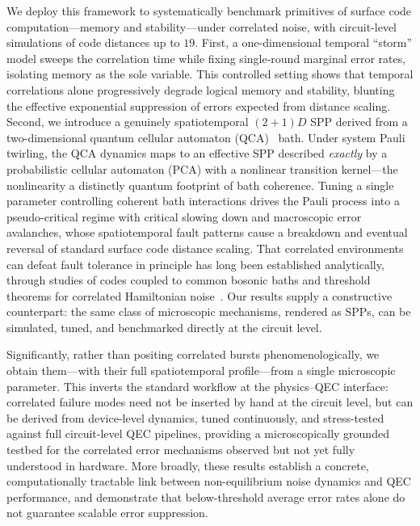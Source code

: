 \documentclass[
    aps,
    prx,
    reprint,
    superscriptaddress,
    longbibliography,
    nofootinbib,
    floatfix,
]{revtex4-2}
\begin{document}
We deploy this framework to systematically benchmark primitives of surface code computation---memory and stability---under correlated noise, with circuit-level simulations of code distances up to \(19\). First, a one-dimensional temporal ``storm'' model sweeps the correlation time while fixing single-round marginal error rates, isolating memory as the sole variable. This controlled setting shows that temporal correlations alone progressively degrade logical memory and stability, blunting the effective exponential suppression of errors expected from distance scaling. Second, we introduce a genuinely spatiotemporal \((2+1)D\) SPP derived from a two-dimensional quantum cellular automaton (QCA)~\cite{schumacherReversibleQuantumCellular2004,farrellyReviewQuantumCellular2020} bath. Under system Pauli twirling, the QCA dynamics maps to an effective SPP described \emph{exactly} by a probabilistic cellular automaton (PCA) with a nonlinear transition kernel---the nonlinearity a distinctly quantum footprint of bath coherence. Tuning a single parameter controlling coherent bath interactions drives the Pauli process into a pseudo-critical regime with critical slowing down and macroscopic error avalanches, whose spatiotemporal fault patterns cause a breakdown and eventual reversal of standard surface code distance scaling. That correlated environments can defeat fault tolerance in principle has long been established analytically, through studies of codes coupled to common bosonic baths and threshold theorems for correlated Hamiltonian noise~\cite{klesseQuantumErrorCorrection2005,novaisDecoherenceCorrelatedNoise2006,novaisSurfaceCodeThreshold2013,hutterBreakdownSurfacecodeError2014,terhalFaulttolerantQuantumComputation2005,aharonovFaultTolerantQuantumComputation2006,ngFaulttolerantQuantumComputation2009,preskillSufficientConditionNoise2013}. Our results supply a constructive counterpart: the same class of microscopic mechanisms, rendered as SPPs, can be simulated, tuned, and benchmarked directly at the circuit level.

Significantly, rather than positing correlated bursts phenomenologically, we obtain them---with their full spatiotemporal profile---from a single microscopic parameter. This inverts the standard workflow at the physics--QEC interface: correlated failure modes need not be inserted by hand at the circuit level, but can be derived from device-level dynamics, tuned continuously, and stress-tested against full circuit-level QEC pipelines, providing a microscopically grounded testbed for the correlated error mechanisms observed but not yet fully understood in hardware. More broadly, these results establish a concrete, computationally tractable link between non-equilibrium noise dynamics and QEC performance, and demonstrate that below-threshold average error rates alone do not guarantee scalable error suppression.
\end{document}

